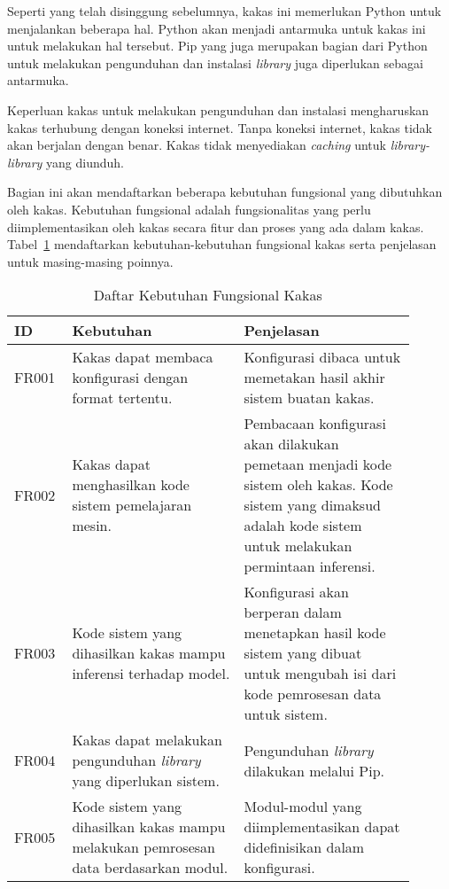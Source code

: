 
Seperti yang telah disinggung sebelumnya, kakas ini memerlukan Python untuk menjalankan beberapa hal.
Python akan menjadi antarmuka untuk kakas ini untuk melakukan hal tersebut.
Pip yang juga merupakan bagian dari Python untuk melakukan pengunduhan dan instalasi \textit{library} juga diperlukan sebagai antarmuka. 


Keperluan kakas untuk melakukan pengunduhan dan instalasi mengharuskan kakas terhubung dengan koneksi internet.
Tanpa koneksi internet, kakas tidak akan berjalan dengan benar.
Kakas tidak menyediakan \textit{caching} untuk \textit{library-library} yang diunduh.


Bagian ini akan mendaftarkan beberapa kebutuhan fungsional yang dibutuhkan oleh kakas.
Kebutuhan fungsional adalah fungsionalitas yang perlu diimplementasikan oleh kakas secara fitur dan proses yang ada dalam kakas.
Tabel~\ref{table:functional-req} mendaftarkan kebutuhan-kebutuhan fungsional kakas serta penjelasan untuk masing-masing poinnya.

\begin{table}[ht]
    \caption{Daftar Kebutuhan Fungsional Kakas}\label{table:functional-req}
    \scriptsize
    \centering
    \begin{tabular}{|p{0.1\linewidth}|p{0.4\linewidth}|p{0.4\linewidth}|} 
        \hline
        \textbf{ID} & \textbf{Kebutuhan} & \textbf{Penjelasan}\\ [0.5ex] 
        \hline
        FR001 & Kakas dapat membaca konfigurasi dengan format tertentu. & Konfigurasi dibaca untuk memetakan hasil akhir sistem buatan kakas. \\ 
        \hline
        FR002 & Kakas dapat menghasilkan kode sistem pemelajaran mesin. & Pembacaan konfigurasi akan dilakukan pemetaan menjadi kode sistem oleh kakas. Kode sistem yang dimaksud adalah kode sistem untuk melakukan permintaan inferensi.  \\ 
        \hline
        FR003 & Kode sistem yang dihasilkan kakas mampu inferensi terhadap model. &  Konfigurasi akan berperan dalam menetapkan hasil kode sistem yang dibuat untuk mengubah isi dari kode pemrosesan data untuk sistem. \\ 
        \hline
        FR004 & Kakas dapat melakukan pengunduhan \textit{library} yang diperlukan sistem. & Pengunduhan \textit{library} dilakukan melalui Pip. \\ 
        \hline
        FR005 & Kode sistem yang dihasilkan kakas mampu melakukan pemrosesan data berdasarkan modul. &  Modul-modul yang diimplementasikan dapat didefinisikan dalam konfigurasi. \\ 
        \hline
    \end{tabular}
\end{table}

